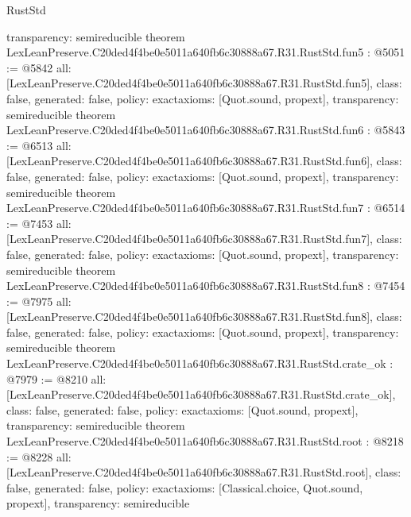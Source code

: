 \begin{lexlean}{RustStd}
\begin{coremodule}
{  transparency: semireducible
}
theorem LexLeanPreserve.C20ded4f4be0e5011a640fb6c30888a67.R31.RustStd.fun5 : @5051 := @5842 {
  all: [LexLeanPreserve.C20ded4f4be0e5011a640fb6c30888a67.R31.RustStd.fun5],
  class: false,
  generated: false,
  policy: exact{axioms: [Quot.sound, propext]},
  transparency: semireducible
}
theorem LexLeanPreserve.C20ded4f4be0e5011a640fb6c30888a67.R31.RustStd.fun6 : @5843 := @6513 {
  all: [LexLeanPreserve.C20ded4f4be0e5011a640fb6c30888a67.R31.RustStd.fun6],
  class: false,
  generated: false,
  policy: exact{axioms: [Quot.sound, propext]},
  transparency: semireducible
}
theorem LexLeanPreserve.C20ded4f4be0e5011a640fb6c30888a67.R31.RustStd.fun7 : @6514 := @7453 {
  all: [LexLeanPreserve.C20ded4f4be0e5011a640fb6c30888a67.R31.RustStd.fun7],
  class: false,
  generated: false,
  policy: exact{axioms: [Quot.sound, propext]},
  transparency: semireducible
}
theorem LexLeanPreserve.C20ded4f4be0e5011a640fb6c30888a67.R31.RustStd.fun8 : @7454 := @7975 {
  all: [LexLeanPreserve.C20ded4f4be0e5011a640fb6c30888a67.R31.RustStd.fun8],
  class: false,
  generated: false,
  policy: exact{axioms: [Quot.sound, propext]},
  transparency: semireducible
}
theorem LexLeanPreserve.C20ded4f4be0e5011a640fb6c30888a67.R31.RustStd.crate_ok : @7979 := @8210 {
  all: [LexLeanPreserve.C20ded4f4be0e5011a640fb6c30888a67.R31.RustStd.crate_ok],
  class: false,
  generated: false,
  policy: exact{axioms: [Quot.sound, propext]},
  transparency: semireducible
}
theorem LexLeanPreserve.C20ded4f4be0e5011a640fb6c30888a67.R31.RustStd.root : @8218 := @8228 {
  all: [LexLeanPreserve.C20ded4f4be0e5011a640fb6c30888a67.R31.RustStd.root],
  class: false,
  generated: false,
  policy: exact{axioms: [Classical.choice, Quot.sound, propext]},
  transparency: semireducible
}


\end{coremodule}
\end{lexlean}
